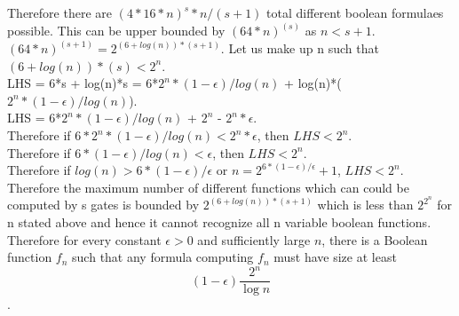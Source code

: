 \documentclass[12pt]{exam}
\begin{document}
\begin{questions}
\begin{solution}
Therefore there are $(4*16*n)^{s}*n/(s+1)$ total different boolean formulaes
possible. This can be upper bounded by ${(64*n)}^{(s)}$ as $n < s+1$.
${(64*n)}^{(s+1)} = 2^{(6+log(n))*(s+1)}$. Let us make up n
such that $(6+log(n))*(s) < 2^n$.\\
LHS = 6*s + log(n)*s = 6*$2^n*(1 - \epsilon)/log(n)$ + log(n)*($2^n*(1 - \epsilon)/log(n)$).\\
LHS = 6*$2^n*(1 - \epsilon)/log(n)$  + $2^n$ - $2^n*\epsilon$.\\
Therefore if $6*2^n*(1 - \epsilon)/log(n) < 2^n*\epsilon$, then $LHS < 2^n$.\\
Therefore if $6*(1-\epsilon)/log(n) < \epsilon$, then $LHS < 2^n$.\\
Therefore if $log(n) > 6*(1-\epsilon)/\epsilon$ or $n = 2^{6*(1-\epsilon)/\epsilon} + 1$,
$LHS < 2^n$.\\
Therefore the maximum number of different functions which can could
be computed by s gates is bounded by $2^{(6+log(n))*(s+1)}$ which
is less than $2^{2^n}$ for n stated above and hence it cannot recognize
all n variable boolean functions.\\

Therefore for every constant $\epsilon > 0$ and sufficiently large $n$,
there is a Boolean function $f_n$ such that any formula computing
$f_n$ must have size at least $$(1-\epsilon)\frac{2^n}{\log n}$$.

\end{solution}
\end{questions}
\end{document}

